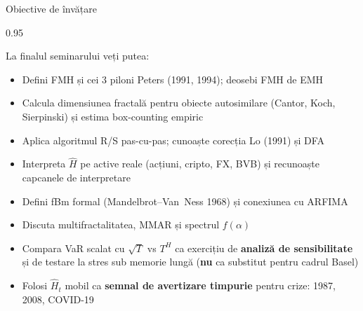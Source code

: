 \documentclass[9pt, aspectratio=169, t]{beamer}
\begin{document}
\begin{frame}[shrink=15]{Obiective de învățare}
\begin{cminipage}{0.95\textwidth}
\begin{block}{La finalul seminarului veți putea:}
\begin{itemize}\setlength{\itemsep}{0pt}
    \item Defini FMH și cei 3 piloni Peters (1991, 1994); deosebi FMH de EMH
    \item Calcula dimensiunea fractală pentru obiecte autosimilare (Cantor, Koch, Sierpinski) și estima box-counting empiric
    \item Aplica algoritmul R/S pas-cu-pas; cunoaște corecția Lo (1991) și DFA
    \item Interpreta $\hat H$ pe active reale (acțiuni, cripto, FX, BVB) și recunoaște capcanele de interpretare
    \item Defini fBm formal (Mandelbrot--Van~Ness 1968) și conexiunea cu ARFIMA
    \item Discuta multifractalitatea, MMAR și spectrul $f(\alpha)$
    \item Compara VaR scalat cu $\sqrt T$ vs $T^H$ ca exercițiu de \textbf{analiză de sensibilitate} și de testare la stres sub memorie lungă (\textbf{nu} ca substitut pentru cadrul Basel)
    \item Folosi $\hat H_t$ mobil ca \textbf{semnal de avertizare timpurie} pentru crize: 1987, 2008, COVID-19
\end{itemize}
\end{block}
\end{cminipage}
\end{frame}
\end{document}
